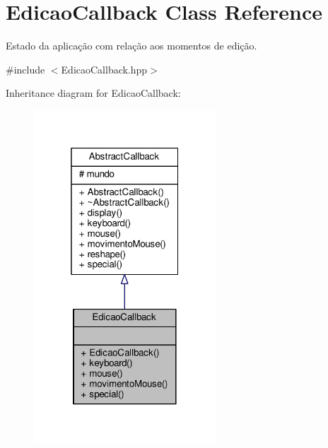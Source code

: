 \hypertarget{classEdicaoCallback}{\section{Edicao\+Callback Class Reference}
\label{classEdicaoCallback}
}


Estado da aplicação com relação aos momentos de edição.  




{\ttfamily \#include $<$Edicao\+Callback.\+hpp$>$}



Inheritance diagram for Edicao\+Callback\+:
\nopagebreak
\begin{figure}[H]
\begin{center}
\leavevmode
\includegraphics[width=193pt]{classEdicaoCallback__inherit__graph}
\end{center}
\end{figure}


